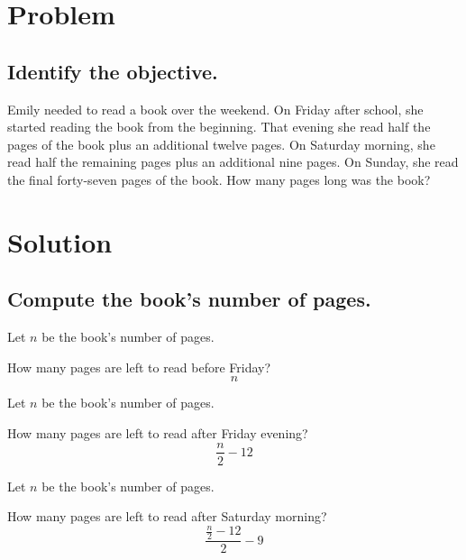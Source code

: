 \documentclass{beamer} %
\begin{document}
\begin{frame} %
  \titlepage
\end{frame}

\section{Problem}

\subsection*{Identify the objective.}

\begin{frame}
  Emily needed to read a book over the weekend. On Friday after school, she started reading the book from the beginning. That evening she read half the pages of the book plus an additional twelve pages. On Saturday morning, she read half the remaining pages plus an additional nine pages. On Sunday, she read the final forty-seven pages of the book. How many pages long was the book?
\end{frame}

\section{Solution}

\subsection*{Compute the book's number of pages.}

\begin{frame}
  Let $n$ be the book's number of pages.

  How many pages are left to read before Friday?
  \[n\]
\end{frame}

\setcounter{equation}{0} %

\begin{frame}
  Let $n$ be the book's number of pages.

  How many pages are left to read after Friday evening?
  \[\frac{n}{2}-12\]
\end{frame}

\begin{frame}
  Let $n$ be the book's number of pages.

  How many pages are left to read after Saturday morning?
  \[\frac{\frac{n}{2}-12}{2}-9\]
\end{frame}
\end{document}

